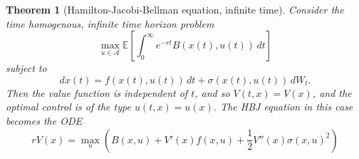 \documentclass[10pt, oneside, reqno]{amsart}
\theoremstyle{plain}%
\newtheorem{thm}{Theorem}[section]
\theoremstyle{definition}
\theoremstyle{remark}
\newcommand{\E}{\mathbb{E}}
\begin{document}
\begin{thm}[Hamilton-Jacobi-Bellman equation, infinite time]
	Consider the time homogenous, infinite time horizon problem \[
		\max_{u \in \mathcal A} \E \left[ \int_0^\infty e^{-rt} B(x(t), u(t)) \, dt \right] 
	\] subject to \[
		dx(t) = f(x(t), u(t)) \, dt + \sigma(x(t), u(t)) \, dW_t.
	\] Then the value function is independent of $t$, and so $V(t,x) = V(x)$, and the optimal control is of the type $u(t, x) = u(x)$.  The HBJ equation in this case becomes the ODE \[
		rV(x) = \max_u \left( B(x, u) + V'(x) f(x, u) + \frac{1}{2} V''(x) \sigma(x, u)^2 \right)
	\] 
\end{thm}
\end{document}
